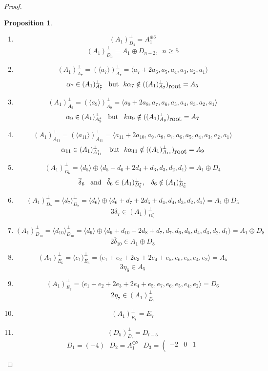 \documentclass{amsart}
\newtheorem{proposition}{Proposition}
\begin{document}
\begin{proof}
\begin{proposition}
\begin{enumerate}
with $\det L_{n-2}^2=2(n+1)$ 
\item $$(A_1)_{D_4}^{\perp}=A_1^{\oplus 3}$$
 $$(A_1)_{D_n}^{\perp}=A_1 \oplus D_{n-2}, \,\,\, n\geq 5$$
\item
$$(A_1)_{A_7}^{\perp}=(\langle a_7\rangle)_{A_7}^{\perp} =\langle a_7+2a_6,a_5,a_4,a_3,a_2,a_1\rangle$$
$$\alpha_7 \in (A_1)_{A_7^*}^{\perp} \,\,\,\,\, \hbox{but}\,\,\,\, k\alpha_7 \notin ((A_1)_{A_7}^{\perp})_{\hbox{root}}=A_5$$
\item
$$(A_1)_{A_9}^{\perp}=(\langle a_9\rangle)_{A_9}^{\perp} =\langle a_9+2a_8,a_7,a_6,a_5,a_4,a_3,a_2,a_1\rangle$$
$$\alpha_9 \in (A_1)_{A_9^*}^{\perp} \,\,\,\,\, \hbox{but}\,\,\,\,\, k\alpha_9 \notin ((A_1)_{A_9}^{\perp})_{\hbox{root}}=A_7$$
\item
$$(A_1)_{A_{11}}^{\perp}=(\langle a_{11} \rangle )_{A_{11}}^{\perp}=\langle a_{11}+2a_{10},a_9,a_8,a_7,a_6,a_5,a_4,a_3,a_2,a_1 \rangle$$
$$\alpha_{11}\in (A_1)_{A_{11}^*}^{\perp}\, \,\,\,\,\,\hbox{but}\,\,\,\,
 k\alpha_{11} \notin ((A_1)_{A_{11}}^{\perp})_{\hbox{root}}=A_9 $$
\item
$$(A_1)_{D_6}^{\perp} =\langle d_5 \rangle \oplus \langle d_5+d_6+2d_4+d_3,d_3,d_2,d_1 \rangle =A_1 \oplus D_4$$
$$\overline{\delta}_6 \,\,\,\,\,\hbox{and}\,\,\,\,\, \tilde{\delta}_6 \in (A_1)_{D_6^*}^{\perp},\,\,\,\,\,\delta_6 \notin (A_1)_{D_6^*}^{\perp}$$
\item
$$(A_1)_{D_7}^{\perp}=\langle d_7 \rangle_{D_7}^{\perp} =\langle d_6 \rangle \oplus \langle d_6+d_7+2d_5+d_4,d_4,d_3,d_2,d_1 \rangle=A_1\oplus D_5$$
$$3\delta_7 \in (A_1)_{D_7^*}^{\perp}$$
\item
$$(A_1)_{D_{10}}^{\perp}=\langle d_{10} \rangle_{D_{10}}^{\perp}=\langle d_9 \rangle \oplus \langle d_9+d_{10}+2d_8+d_7,d_7,d_6,d_5,d_4,d_3,d_2,d_1 \rangle =A_1 \oplus D_8$$
$$2\overline{\delta}_{10} \in A_1 \oplus D_8$$
\item
$$(A_1)_{E_6}^{\perp}=\langle e_1 \rangle _{E_6}^{\perp}=\langle e_1+e_2+2e_3+2e_4+e_5,e_6,e_5,e_4,e_2 \rangle =A_5$$
$$3\eta_6 \in A_5$$
\item
$$(A_1)_{E_7}^{\perp}=\langle e_1+e_2+2e_3+2e_4+e_5,e_7,e_6,e_5,e_4,e_2 \rangle
=D_6 $$
$$2\eta_7 \in (A_1)_{E_7}^{\perp}$$
\item $$(A_1)_{E_8}^{\perp}=E_7$$
\item $$(D_5)_{D_l}^{\perp}=D_{l-5}$$
$$D_1=(-4) \,\,\,\, D_2=A_1^{\oplus 2}\,\,\,\,D_3=\left (
                                                \begin{matrix}
                                                -2 & 0 & 1 \\

\end{matrix}$$
\end{enumerate}
\end{proposition}
\end{proof}
\end{document}
